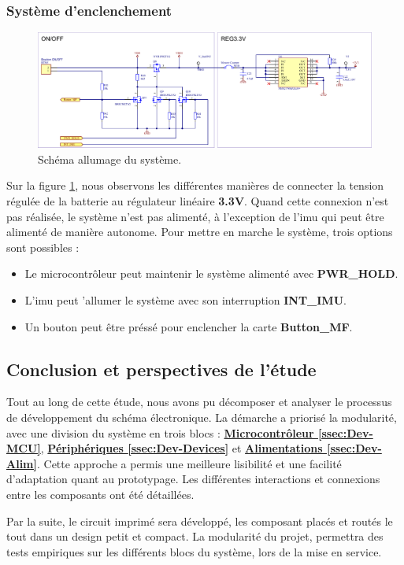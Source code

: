 \clearpage

\subsubsection{Système d'enclenchement} \label{sssec:On-OFF}


\begin{figure}[h]
	\centering
	\includegraphics[width=1\linewidth]{../figures/etude/sch/ON-OFF}
	\caption{Schéma allumage du système.}
	\label{fig:on-off}
\end{figure}

Sur la figure \ref{fig:on-off}, nous observons les différentes manières de connecter la tension régulée de la batterie au régulateur linéaire \textbf{3.3V}. Quand cette connexion n'est pas réalisée, le système n'est pas alimenté, à l'exception de l'\gls{imu} qui peut être alimenté de manière autonome. Pour mettre en marche le système, trois options sont possibles : \vspace{2mm}

\begin{itemize}
	\item[\faChevronRight] Le microcontrôleur peut maintenir le système alimenté avec \textbf{PWR\_HOLD}. 
	\item[\faChevronRight] L'\gls{imu} peut 'allumer le système avec son interruption \textbf{INT\_IMU}. 
	\item[\faChevronRight] Un bouton peut être préssé pour enclencher la carte \textbf{Button\_MF}. 
\end{itemize}

\subsection{Conclusion et perspectives de l'étude} \label{ssec:Conclusion-etude}

Tout au long de cette étude, nous avons pu décomposer et analyser le processus de développement du schéma électronique. La démarche a priorisé la modularité, avec une division du système en trois blocs : \hyperref[ssec:Dev-MCU]{\textbf{Microcontrôleur \ref{ssec:Dev-MCU}}}, \hyperref[ssec:Dev-Devices]{\textbf{Périphériques \ref{ssec:Dev-Devices}}} et \hyperref[ssec:Dev-Alim]{\textbf{Alimentations \ref{ssec:Dev-Alim}}}. Cette approche a permis une meilleure lisibilité et une facilité d'adaptation quant au prototypage. Les différentes interactions et connexions entre les composants ont été détaillées.

Par la suite, le circuit imprimé sera développé, les composant placés et routés le tout dans un design petit et compact. La modularité du projet, permettra des tests empiriques sur les différents blocs du système, lors de la mise en service.


